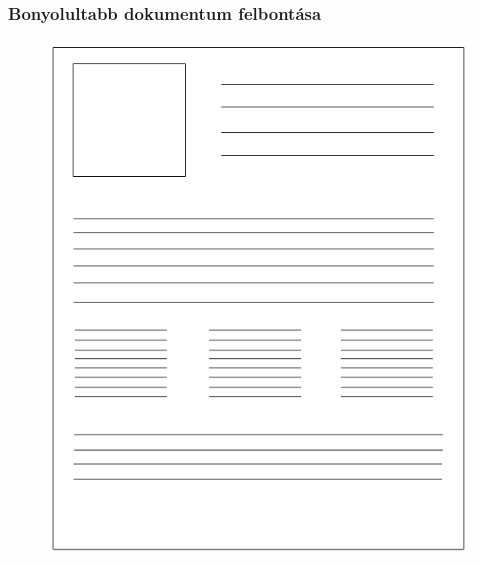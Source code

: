\documentclass{beamer}
\begin{document}
\begin{frame}[fragile]
\frametitle{Bonyolultabb dokumentum felbontása}

\begin{figure}[!tbp]
  \centering
  \begin{minipage}[b]{0.3\textwidth}
    \includegraphics[width=\textwidth]{images/page_complicated.png}
  \end{minipage}
  \hfill
  \begin{minipage}[b]{0.3\textwidth}

\end{minipage}
\end{figure}
\end{frame}
\end{document}
